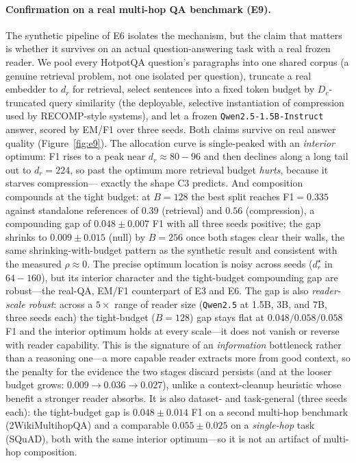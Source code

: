 \documentclass{article}
\newcommand{\dr}{d_r}
\begin{document}
\paragraph{Confirmation on a real multi-hop QA benchmark (E9).} The synthetic pipeline of E6 isolates
the mechanism, but the claim that matters is whether it survives on an actual question-answering task
with a real frozen reader. We pool every HotpotQA question's paragraphs into one shared corpus (a
genuine retrieval problem, not one isolated per question), truncate a real embedder to $\dr$ for
retrieval, select sentences into a fixed token budget by $D_c$-truncated query similarity (the
deployable, selective instantiation of compression used by RECOMP-style systems), and let a frozen
\texttt{Qwen2.5-1.5B-Instruct} answer, scored by EM/F1 over three seeds. Both claims survive on real
answer quality (Figure~\ref{fig:e9}). The allocation curve is single-peaked with an \emph{interior}
optimum: F1 rises to a peak near $\dr\!\approx\!80\!-\!96$ and then declines along a long tail out to
$\dr{=}224$, so past the optimum more retrieval budget \emph{hurts}, because it starves compression---
exactly the shape C3 predicts. And composition compounds at the tight budget: at $B=128$ the best
split reaches F1$=0.335$ against standalone references of $0.39$ (retrieval) and $0.56$ (compression),
a compounding gap of $\mathbf{0.048\pm0.007}$ F1 with all three seeds positive; the gap shrinks to
$0.009\pm0.015$ (null) by $B=256$ once both stages clear their walls, the same shrinking-with-budget
pattern as the synthetic result and consistent with the measured $\rho\!\approx\!0$. The precise
optimum location is noisy across seeds ($\dr^\star$ in $64\!-\!160$), but its interior character and
the tight-budget compounding gap are robust---the real-QA, EM/F1 counterpart of E3 and E6. The gap
is also \emph{reader-scale robust}: across a $5\times$ range of reader size (\texttt{Qwen2.5} at
1.5B, 3B, and 7B, three seeds each) the tight-budget ($B{=}128$) gap stays flat at $0.048/0.058/0.058$
F1 and the interior optimum holds at every scale---it does not vanish or reverse with reader
capability. This is the signature of an \emph{information} bottleneck rather than a reasoning one---a
more capable reader extracts more from good context, so the penalty for the evidence the two stages
discard persists (and at the looser budget grows: $0.009{\to}0.036{\to}0.027$), unlike a
context-cleanup heuristic whose benefit a stronger reader absorbs. It is also dataset- and
task-general (three seeds each): the tight-budget gap is $0.048\pm0.014$ F1 on a second multi-hop
benchmark (2WikiMultihopQA) and a comparable $0.055\pm0.025$ on a \emph{single-hop} task (SQuAD),
both with the same interior optimum---so it is not an artifact of multi-hop composition.
\end{document}
